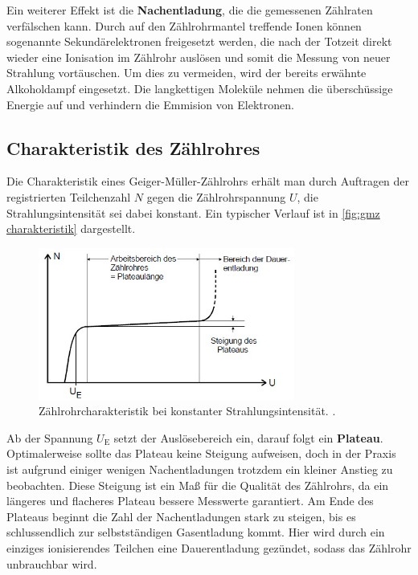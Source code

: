 Ein weiterer Effekt ist die \textbf{Nachentladung}, die die gemessenen Zählraten verfälschen kann.
Durch auf den Zählrohrmantel treffende Ionen können sogenannte Sekundärelektronen freigesetzt werden, die
nach der Totzeit direkt wieder eine Ionisation im Zählrohr auslösen und somit die Messung von neuer Strahlung vortäuschen.
Um dies zu vermeiden, wird der bereits erwähnte Alkoholdampf eingesetzt. Die langkettigen Moleküle nehmen
die überschüssige Energie auf und verhindern die Emmision von Elektronen.

\subsection{Charakteristik des Zählrohres}
Die Charakteristik eines Geiger-Müller-Zählrohrs erhält man durch Auftragen der registrierten Teilchenzahl $N$
gegen die Zählrohrspannung $U$, die Strahlungsintensität sei dabei konstant. Ein typischer Verlauf ist
in \autoref{fig:gmz charakteristik} dargestellt.

\begin{figure}[H]
    \centering
    \includegraphics[height=5cm]{content/pics/charakteristik.jpg}
    \caption{Zählrohrcharakteristik bei konstanter Strahlungsintensität. \cite{v703}.}
    \label{fig:gmz charakteristik}
\end{figure}

Ab der Spannung $U_\text{E}$ setzt der Auslösebereich ein, darauf folgt ein \textbf{Plateau}.
Optimalerweise sollte das Plateau keine Steigung aufweisen, doch in der Praxis ist aufgrund
einiger wenigen Nachentladungen trotzdem ein kleiner Anstieg zu beobachten.
Diese Steigung ist ein Maß für die Qualität des Zählrohrs, da ein längeres und flacheres
Plateau bessere Messwerte garantiert.
Am Ende des Plateaus beginnt die Zahl der Nachentladungen stark zu steigen, bis es schlussendlich
zur selbstständigen Gasentladung kommt.
Hier wird durch ein einziges ionisierendes Teilchen eine Dauerentladung gezündet, sodass das
Zählrohr unbrauchbar wird.